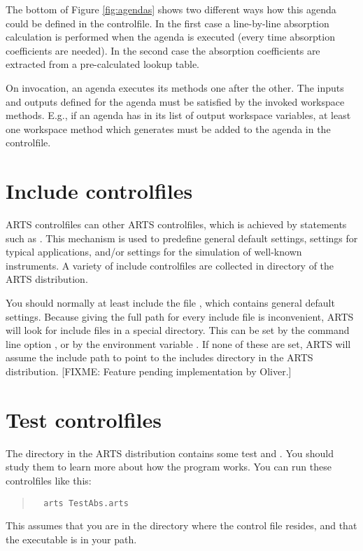 The bottom of Figure \ref{fig:agendas} shows two different ways how this agenda
could be defined in the controlfile. In the first case a line-by-line
absorption calculation is performed when the agenda is executed (every time
absorption coefficients are needed). In the second case the absorption
coefficients are extracted from a pre-calculated lookup table.

On invocation, an agenda executes its methods one after the
other. The inputs and outputs defined for the agenda must be satisfied
by the invoked workspace methods. E.g., if an agenda has
 in its list of output workspace
variables, at least one workspace method which generates
 must be added to the agenda in the
controlfile.

\section{Include controlfiles}

ARTS controlfiles can \emph{} other ARTS
controlfiles, which is achieved by statements such as
.  This mechanism is used to
predefine general default settings, settings for typical applications,
and/or settings for the simulation of well-known instruments.  A
variety of include controlfiles are collected in directory
 of the ARTS distribution.

You should normally at least include the file
, which contains general default
settings. Because giving the full path for every include file is
inconvenient, ARTS will look for include files in a special
directory.  This can be set by the command line option , or by the environment variable
.  If none of these are set, ARTS will
assume the include path to point to the includes directory in the ARTS
distribution. [FIXME: Feature pending implementation by Oliver.]

\section{Test controlfiles}

The directory  in the ARTS distribution contains some
test and .  You should study them to learn more about how
the program works. You can run these controlfiles like this:
\begin{quote}
\begin{verbatim}
  arts TestAbs.arts
\end{verbatim}
\end{quote}
This assumes that you are in the directory where the control
file resides, and that the  executable is in
your path. 

